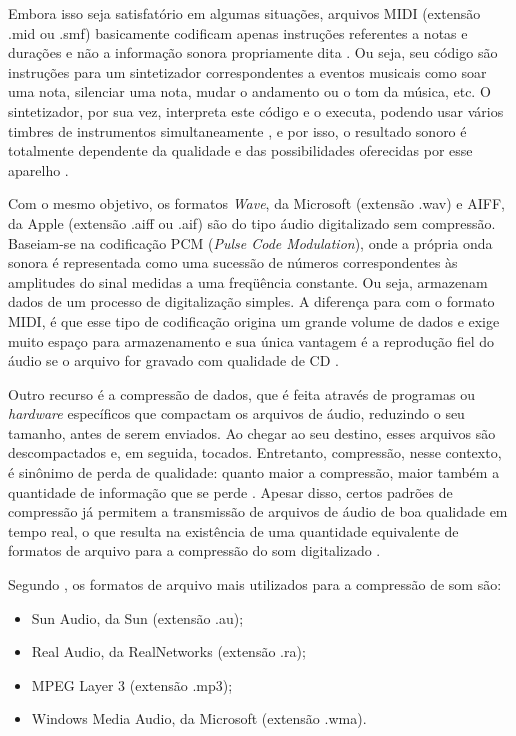 Embora isso seja satisfatório em algumas situações, arquivos MIDI (extensão .mid ou .smf) basicamente codificam apenas instruções referentes a notas e durações e não a informação sonora propriamente dita \cite{fernando&kon1998}. Ou seja, seu código são instruções para um sintetizador correspondentes a eventos musicais como soar uma nota, silenciar uma nota, mudar o andamento ou o tom da música, etc. O sintetizador, por sua vez, interpreta este código e o executa, podendo usar vários timbres de instrumentos simultaneamente \cite{miletto2004}, e por isso, o resultado sonoro é totalmente dependente da qualidade e das possibilidades oferecidas por esse aparelho \cite{fernando&kon1998}.

Com o mesmo objetivo, os formatos \textit{Wave}, da Microsoft (extensão .wav) e AIFF, da Apple (extensão .aiff ou .aif) são do tipo áudio digitalizado sem compressão. Baseiam-se na codificação PCM (\textit{Pulse Code Modulation}), onde a própria onda sonora é representada como uma sucessão de números correspondentes às amplitudes do sinal medidas a uma freqüência constante. Ou seja, armazenam dados de um processo de digitalização simples. A diferença para com o formato MIDI, é que esse tipo de codificação origina um grande volume de dados e exige muito espaço para armazenamento e sua única vantagem é a reprodução fiel do áudio se o arquivo for gravado com qualidade de CD \cite{miletto2004}.

Outro recurso é a compressão de dados, que é feita através de programas ou \textit{hardware} específicos que compactam os arquivos de áudio, reduzindo o seu tamanho, antes de serem enviados. Ao chegar ao seu destino, esses arquivos são descompactados e, em seguida, tocados. Entretanto, compressão, nesse contexto, é sinônimo de perda de qualidade: quanto maior a compressão, maior também a quantidade de informação que se perde \cite{fernando&kon1998}. Apesar disso, certos padrões de compressão já permitem a transmissão de arquivos de áudio de boa qualidade em tempo real, o que resulta na existência de uma quantidade equivalente de formatos de arquivo para a compressão do som digitalizado \cite{miletto2004}.

Segundo , os formatos de arquivo mais utilizados para a compressão de som são:

\begin{itemize}
   \item Sun Audio, da Sun (extensão .au);
   \item Real Audio, da RealNetworks (extensão .ra);
   \item MPEG Layer 3 (extensão .mp3);
   \item Windows Media Audio, da Microsoft (extensão .wma).
 \end{itemize}
 
